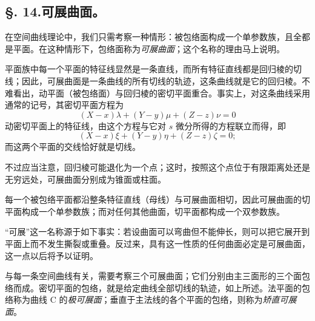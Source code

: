 \subsection*{\S. 14.\quad 可展曲面。}
在空间曲线理论中，我们只需考察一种情形：被包络面构成一个单参数族，且全都是平面。在这种情形下，包络面称为\emph{可展曲面}；这个名称的理由马上说明。

平面族中每一个平面的特征线显然是一条直线，而所有特征直线都是回归棱的切线；因此，可展曲面是一条曲线的所有切线的轨迹，这条曲线就是它的回归棱。不难看出，动平面（被包络面）与回归棱的密切平面重合。事实上，对这条曲线采用通常的记号，其密切平面方程为
\[
(X-x)\lambda+(Y-y)\mu+(Z-z)\nu=0
\]
动密切平面上的特征线，由这个方程与它对 \(s\) 微分所得的方程联立而得，即
\[
(X-x)\xi+(Y-y)\eta+(Z-z)\zeta=0;
\]
而这两个平面的交线恰好就是切线。

不过应当注意，回归棱可能退化为一个点；这时，按照这个点位于有限距离处还是无穷远处，可展曲面分别成为锥面或柱面。

每一个被包络平面都沿整条特征直线（母线）与可展曲面相切，因此可展曲面的切平面构成一个单参数族；而对任何其他曲面，切平面都构成一个双参数族。

“可展”这一名称源于如下事实：若设曲面可以弯曲但不能伸长，则可以把它展开到平面上而不发生撕裂或重叠。反过来，具有这一性质的任何曲面必定是可展曲面，这一点以后将予以证明。

与每一条空间曲线有关，需要考察三个可展曲面；它们分别由主三面形的三个面包络而成。密切平面的包络，就是给定曲线全部切线的轨迹，如上所述。法平面的包络称为曲线 C 的\emph{极可展面}；垂直于主法线的各个平面的包络，则称为\emph{矫直可展面}。
